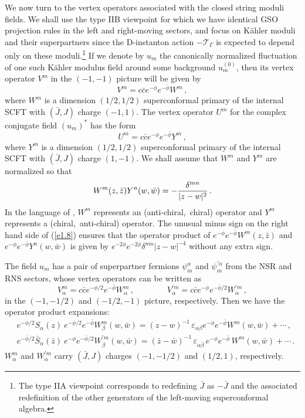 \documentclass[12pt,a4paper]{article}
\newcommand{\be}{\begin{equation}}
\newcommand{\ee}{\end{equation}}
\newcommand{\refb}[1]{(\ref{#1})}
\newcommand{\ve}{\varepsilon}
\newcommand{\bw}{\bar w}
\newcommand{\cT}{\mathcal{T}}
\def\bw{\bar w}
\def\bz{\bar z}
\newcommand{\dalpha}{\beta}
\def\dalpha{{\dot\alpha}}
\def\dbeta{{\dot\beta}}
\def\cpi{u}
\begin{document}
We now turn to the vertex operators associated with the closed string moduli fields. We shall
use the type IIB viewpoint for which we have identical GSO projection rules in the left and
right-moving sectors, and focus on  K\"ahler moduli and their superpartners since the
D-instanton action $-\cT_\Gamma$ is expected to depend only on these moduli.\footnote{The type
IIA viewpoint corresponds to redefining $\bar J$ as $-\bar J$ and the associated redefinition
of the other generators of the left-moving superconformal algebra.}
If we denote by $\cpi_m$ the canonically normalized
fluctuation of one such K\"ahler modulus
field around some background $\cpi^{(0)}_m$, then its vertex operator
$V^m$  in the $(-1,-1)$ picture will be given by
\be
V^{m} = c\bar c e^{-\phi} e^{-\bar\phi} W^{m}\, ,
\label{e1.6b}
\ee
where $W^{m}$ is a dimension $(1/2,1/2)$ superconformal primary of the internal SCFT with
$(\bar J, J)$
charge $(-1,1)$. The vertex operator $U^{m}$ for the complex conjugate field $(\cpi_m)^*$ has the
form
\be
U^{m} = c\bar c e^{-\phi} e^{-\bar\phi} Y^{m}\, ,
\ee
where $Y^{m}$ is a dimension $(1/2,1/2)$ superconformal primary of the internal
SCFT with $(\bar J, J)$
charge $(1,-1)$. We shall assume that $W^{m}$ and $Y^{m}$ are normalized so that
\be\label{e1.8}
W^{m}(z,\bz) Y^{n}(w,\bw)= -{\delta^{mn}\over |z-w|^2}\, .
\ee
In the language of \cite{Lerche:1989uy},
$W^m$ represents an (anti-chiral,~chiral) operator and $Y^m$ represents a
(chiral,~anti-chiral) operator.
The unusual minus sign on the right hand side of \refb{e1.8} ensures that the
operator product of $e^{-\phi}e^{-\bar\phi}W^m(z,\bz)$ and $e^{-\phi}e^{-\bar\phi}
Y^n(w,\bw)$ is given by $e^{-2\phi}e^{-2\bar\phi}\delta^{mn}|z-w|^{-4}$ without any
extra sign.

The field $\cpi_m$ has a pair of superpartner fermions $\psi_m^\alpha$ and
$\psi^{\prime \dalpha}_{m}$
from the NSR and RNS sectors, whose vertex operators can be written as
\be\label{efermuvert}
V^{m}_\alpha=c\bar c e^{-\phi/2} e^{-\bar\phi}
W^{m}_\alpha\,,\qquad\qquad V^{\prime m}_{\dalpha}=c\bar c e^{-\phi} e^{-\bar\phi/2}
W^{\prime m}_{\dalpha}\,,
\ee
in the $(-1,-1/2)$ and $(-1/2,-1)$ picture, respectively. Then we have
the operator product expansions:
\be \label{e1.9a}
\begin{split}
& e^{-\phi/2} S_\alpha (z) \ e^{-\phi/2}e^{-\bar\phi}
W_\beta^{m} (w,\bw) = (z-w)^{-1} \, \ve_{\alpha\beta}
e^{-\phi}e^{-\bar\phi}W^{m}(w,\bw)+ \cdots\, ,
\\
& e^{-\bar\phi/2}\bar S_\dalpha (\bar z) \ e^{-\phi} e^{-\bar\phi/2} W^{\prime m}_{\dbeta}(w,\bw) =
(\bz-\bw)^{-1} \, \ve_{\dalpha\dbeta} \,  e^{-\phi}e^{-\bar\phi}\, W^{m}(w,\bw) +\cdots \, .
\end{split}
\ee
$W_\alpha^{m}$ and $W^{\prime m}_{\dalpha}$ carry $(\bar J,J)$ charges $(-1,-1/2)$ and $(1/2,1)$,
respectively.
\end{document}
